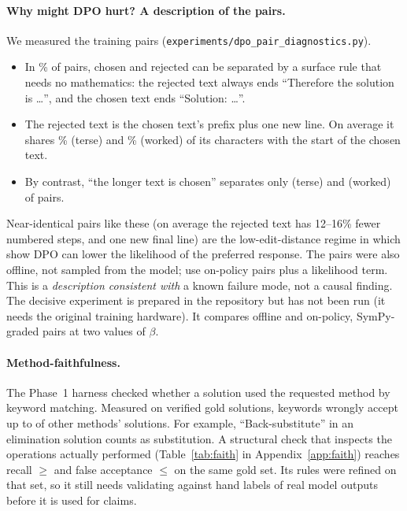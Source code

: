 \documentclass[11pt,a4paper]{article}
\begin{document}
\paragraph{Why might DPO hurt? A description of the pairs.}
We measured the \numDpoPairs{} training pairs (\texttt{experiments/dpo\_pair\_diagnostics.py}).
\begin{itemize}
  \item In \numSurfaceRuleWorked\% of pairs, chosen and rejected can be separated by a surface
        rule that needs no mathematics: the rejected text always ends ``Therefore the
        solution is \ldots'', and the chosen text ends ``Solution: \ldots''.
  \item The rejected text is the chosen text's prefix plus one new line. On average it shares
        \numPrefixTerse\% (terse) and \numPrefixWorked\% (worked) of its characters with the
        start of the chosen text.
  \item By contrast, ``the longer text is chosen'' separates only \numLongerChosenTerse{}
        (terse) and \numLongerChosenWorked{} (worked) of pairs.
\end{itemize}
Near-identical pairs like these (on average the rejected text has 12--16\% fewer
numbered steps, and one new final line) are the low-edit-distance regime in which \citet{pal2024smaug}
show DPO can lower the likelihood of the preferred response. The pairs
were also offline, not sampled from the model; \citet{pang2024iterative} use on-policy pairs
plus a likelihood term. This is a \emph{description consistent with} a known failure mode,
not a causal finding. The decisive experiment is prepared in the repository but has not been
run (it needs the original training hardware). It compares offline and on-policy,
SymPy-graded pairs at two values of $\beta$.

\paragraph{Method-faithfulness.}
The Phase~1 harness checked whether a solution used the requested method by keyword
matching. Measured on verified gold solutions, keywords wrongly accept up to
\numKeywordWorstFA{} of other methods' solutions. For example, ``Back-substitute'' in an
elimination solution counts as substitution. A structural check that inspects the
operations actually performed (Table~\ref{tab:faith} in Appendix~\ref{app:faith}) reaches
recall $\geq$ \numStructMinRecall{} and false acceptance $\leq$ \numStructWorstFA{} on the
same gold set. Its rules were refined on that set, so it still needs validating against
hand labels of real model outputs before it is used for claims.
\end{document}
